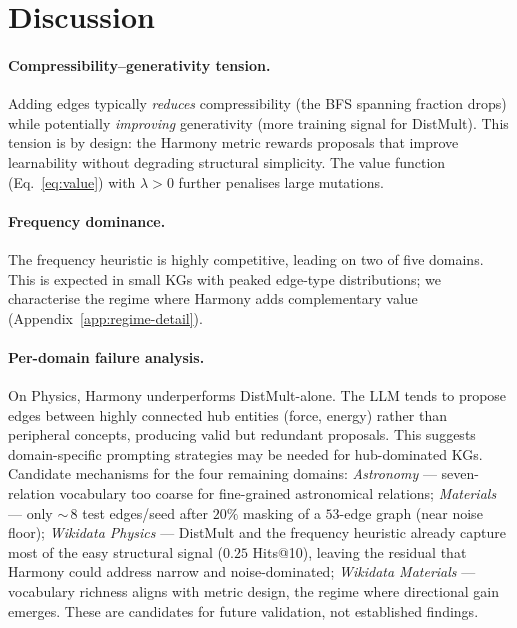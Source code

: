\section{Discussion}\label{sec:discussion}

\paragraph{Compressibility--generativity tension.}
Adding edges typically \emph{reduces} compressibility (the BFS spanning
fraction drops) while potentially \emph{improving} generativity (more training
signal for DistMult).  This tension is by design: the Harmony metric rewards
proposals that improve learnability without degrading structural simplicity.
The value function (Eq.~\ref{eq:value}) with $\lambda > 0$ further penalises
large mutations.

\paragraph{Frequency dominance.}
The frequency heuristic is highly competitive, leading on two of five domains.
This is expected in small KGs with peaked edge-type distributions; we
characterise the regime where Harmony adds complementary value
(Appendix~\ref{app:regime-detail}).

\paragraph{Per-domain failure analysis.}
On Physics, Harmony underperforms DistMult-alone.  The LLM tends to propose
edges between highly connected hub entities (force, energy) rather than
peripheral concepts, producing valid but redundant proposals.  This suggests
domain-specific prompting strategies may be needed for hub-dominated KGs.
Candidate mechanisms for the four remaining domains: \emph{Astronomy} ---
seven-relation vocabulary too coarse for fine-grained astronomical
relations; \emph{Materials} --- only ${\sim}\,8$ test edges/seed after
$20\%$ masking of a $53$-edge graph (near noise floor);
\emph{Wikidata Physics} --- DistMult and the frequency heuristic already
capture most of the easy structural signal ($0.25$ Hits@10), leaving the
residual that Harmony could address narrow and noise-dominated; \emph{Wikidata Materials} --- vocabulary richness aligns
with metric design, the regime where directional gain emerges.  These
are candidates for future validation, not established findings.

